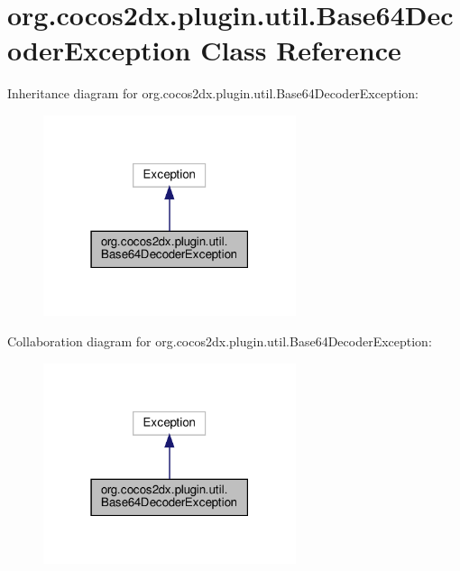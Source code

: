 \hypertarget{classorg_1_1cocos2dx_1_1plugin_1_1util_1_1Base64DecoderException}{}\section{org.\+cocos2dx.\+plugin.\+util.\+Base64\+Decoder\+Exception Class Reference}
\label{classorg_1_1cocos2dx_1_1plugin_1_1util_1_1Base64DecoderException}


Inheritance diagram for org.\+cocos2dx.\+plugin.\+util.\+Base64\+Decoder\+Exception\+:
\nopagebreak
\begin{figure}[H]
\begin{center}
\leavevmode
\includegraphics[width=210pt]{classorg_1_1cocos2dx_1_1plugin_1_1util_1_1Base64DecoderException__inherit__graph}
\end{center}
\end{figure}


Collaboration diagram for org.\+cocos2dx.\+plugin.\+util.\+Base64\+Decoder\+Exception\+:
\nopagebreak
\begin{figure}[H]
\begin{center}
\leavevmode
\includegraphics[width=210pt]{classorg_1_1cocos2dx_1_1plugin_1_1util_1_1Base64DecoderException__coll__graph}
\end{center}
\end{figure}
